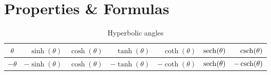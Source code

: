 \section*{Properties \& Formulas}

\begin{customTableWrapper}{1}
\begin{table}[H]
    \centering
    \begin{tabular}{|c|r|r|r|r|r|r|}
        \hline
        $\theta$ & $\sinh(\theta)$ & $\cosh(\theta)$ & $\tanh(\theta)$ & $\coth(\theta)$ & $\operatorname{sech}(\theta)$ & $\operatorname{csch}(\theta)$ \\ \hline

        $-\theta$ & $-\sinh(\theta)$ & $\cosh(\theta)$ & $-\tanh(\theta)$ & $-\coth(\theta)$ & $\operatorname{sech}(\theta)$ & $-\operatorname{csch}(\theta)$ \\ \hline
    \end{tabular}
    \caption{Hyperbolic angles}
\end{table}
\end{customTableWrapper}

